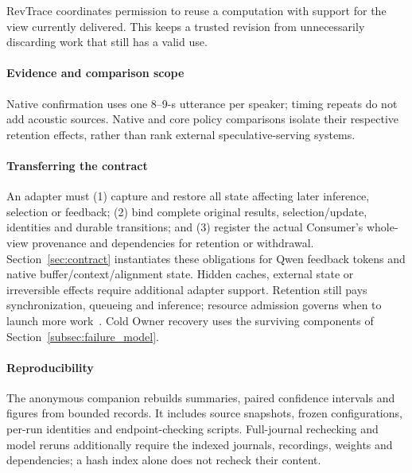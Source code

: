RevTrace coordinates permission to reuse a computation with support for
the view currently delivered. This keeps a trusted revision from
unnecessarily discarding work that still has a valid use.

\paragraph{Evidence and comparison scope}
Native confirmation uses one 8--9-s utterance per speaker; timing repeats
do not add acoustic sources. Native and core policy comparisons isolate
their respective retention effects, rather than rank external
speculative-serving systems.

\paragraph{Transferring the contract}
An adapter must (1) capture and restore all state affecting later
inference, selection or feedback; (2) bind complete original results,
selection/update, identities and durable transitions; and (3) register
the actual Consumer's whole-view provenance and dependencies for retention
or withdrawal. Section~\ref{sec:contract} instantiates these obligations
for Qwen feedback tokens and native buffer/context/alignment state.
Hidden caches, external state or irreversible effects require additional
adapter support.
Retention still pays synchronization, queueing and inference; resource
admission governs when to launch more work~\cite{welsh2001seda}.
Cold Owner recovery uses the surviving components of
Section~\ref{subsec:failure_model}.

\paragraph{Reproducibility}
The anonymous companion rebuilds summaries, paired confidence intervals and figures
from bounded records. It includes source snapshots, frozen configurations,
per-run identities and endpoint-checking scripts. Full-journal rechecking
and model reruns additionally require the indexed journals, recordings,
weights and dependencies; a hash index alone does not recheck their content.
